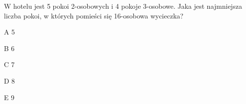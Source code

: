\begin{tresc}
W hotelu jest 5 pokoi 2-osobowych i 4 pokoje 3-osobowe. Jaka jest najmniejsza liczba pokoi, w których pomieści się 16-osobowa wycieczka?
\end{tresc}
\begin{wariant}{A} 5 \end{wariant}
\begin{wariant}{B} 6 \end{wariant}
\begin{wariant}{C} 7 \end{wariant}
\begin{wariant}{D} 8 \end{wariant}
\begin{wariant}{E} 9 \end{wariant}
